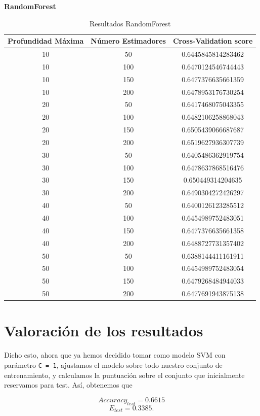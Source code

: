 \documentclass[size=a4, parskip=half, titlepage=false, toc=flat, toc=bib, 12pt]{scrartcl}
\begin{document}
\textbf{RandomForest}

\begin{table}[ht]
    \centering
    \caption{Resultados RandomForest}
    \label{tab:results-plapocket}
    \begin{tabular}{c | c | c  }
  Profundidad Máxima & Número Estimadores & Cross-Validation score \\
 \hline

10 & 50  & 0.6445845814283462 \\
10 & 100&  0.6470124546744443 \\
10 & 150&  0.6477376635661359 \\
10 & 200&  0.6478953176730254 \\
20 & 50&   0.6417468075043355 \\
20 & 100&  0.6482106258868043 \\
20 & 150&  0.6505439066687687 \\
20 & 200&  0.6519627936307739 \\
30 & 50&   0.6405486362919754 \\
30 & 100&  0.6478637868516476 \\
30 & 150&  0.650449314204635 \\
30 & 200&  0.6490304272426297 \\
40 & 50&   0.6400126123285512 \\
40 & 100&  0.6454989752483051 \\
40 & 150&  0.6477376635661358 \\
40 & 200&  0.6488727731357402 \\
50 & 50&   0.6388144411161911 \\
50 & 100&  0.6454989752483054 \\
50 & 150&  0.6479268484944033 \\
50 & 200&  0.6477691943875138
    \end{tabular}
\end{table}
\section{Valoración de los resultados}

Dicho esto, ahora que ya hemos decidido tomar como modelo SVM con parámetro \texttt{C = 1}, ajustamos el modelo sobre todo nuestro conjunto de entrenamiento, y calculamos la puntuación sobre el conjunto que inicialmente reservamos para test. Así, obtenemos que

\[
Accuracy_{test} = 0.6615
\]
\[
E_{test} = 0.3385
.\]
\end{document}
